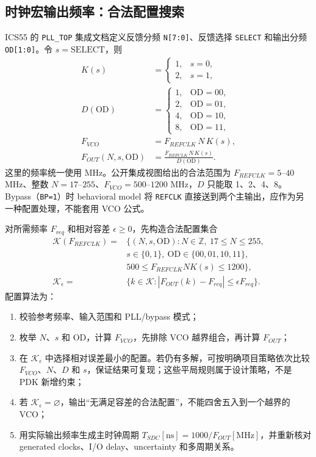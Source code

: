 \documentclass[UTF8,a4paper,11pt,fontset=fandol]{ctexart}
\numberwithin{equation}{section}
\newcommand{\code}[1]{\nolinkurl{#1}}
\begin{document}
\subsection{时钟宏输出频率：合法配置搜索}

ICS55 的 \code{PLL_TOP} 集成文档定义反馈分频 \code{N[7:0]}、反馈选择 \code{SELECT} 和输出分频 \code{OD[1:0]}。令 $s=\mathrm{SELECT}$，则
\begin{align}
K(s)&=\begin{cases}1,&s=0,\\2,&s=1,\end{cases}\\
D(\mathrm{OD})&=\begin{cases}
1,&\mathrm{OD}=00,\\2,&\mathrm{OD}=01,\\
4,&\mathrm{OD}=10,\\8,&\mathrm{OD}=11,
\end{cases}\\
F_{VCO}&=F_{REFCLK}\,N\,K(s),\\
F_{OUT}(N,s,\mathrm{OD})&=\frac{F_{REFCLK}\,N\,K(s)}{D(\mathrm{OD})}.
\label{eq:pll-fout}
\end{align}
这里的频率统一使用 MHz。公开集成视图给出的合法范围为 $F_{REFCLK}=5$--$40$ MHz、整数 $N=17$--$255$、$F_{VCO}=500$--$1200$ MHz，$D$ 只能取 1、2、4、8。Bypass（\code{BP=1}）时 behavioral model 将 \code{REFCLK} 直接送到两个主输出，应作为另一种配置处理，不能套用 VCO 公式\cite{pll}。

对所需频率 $F_{req}$ 和相对容差 $\epsilon\ge0$，先构造合法配置集合
\begin{equation}
\begin{aligned}
\mathcal{K}(F_{REFCLK})={}&\{(N,s,\mathrm{OD}):N\in\mathbb{Z},\ 17\le N\le255,\\
&s\in\{0,1\},\ \mathrm{OD}\in\{00,01,10,11\},\\
&500\le F_{REFCLK}NK(s)\le1200\},\\
\mathcal{K}_{\epsilon}={}&\{k\in\mathcal{K}:|F_{OUT}(k)-F_{req}|\le\epsilon F_{req}\}.
\end{aligned}
\end{equation}
配置算法为：
\begin{enumerate}
  \item 校验参考频率、输入范围和 PLL/bypass 模式；
  \item 枚举 $N$、$s$ 和 $\mathrm{OD}$，计算 $F_{VCO}$，先排除 VCO 越界组合，再计算 $F_{OUT}$；
  \item 在 $\mathcal{K}_{\epsilon}$ 中选择相对误差最小的配置。若仍有多解，可按明确项目策略依次比较 $F_{VCO}$、$N$、$D$ 和 $s$，保证结果可复现；这些平局规则属于设计策略，不是 PDK 新增约束；
  \item 若 $\mathcal{K}_{\epsilon}=\varnothing$，输出“无满足容差的合法配置”，不能四舍五入到一个越界的 VCO；
  \item 用实际输出频率生成主时钟周期 $T_{SDC}[\mathrm{ns}]=1000/F_{OUT}[\mathrm{MHz}]$，并重新核对 generated clocks、I/O delay、uncertainty 和多周期关系。
\end{enumerate}
\end{document}

